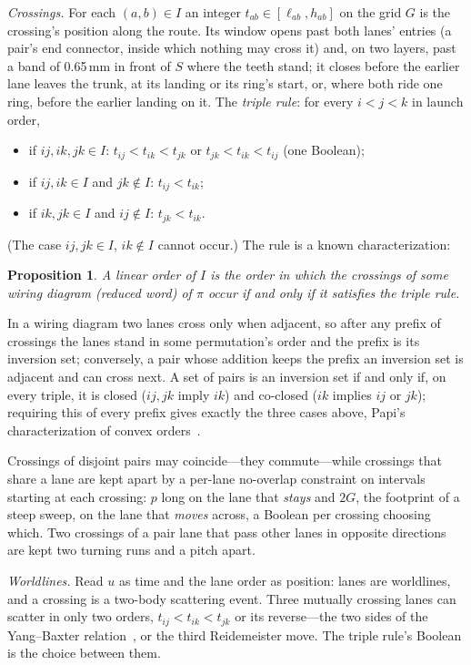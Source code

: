 \documentclass[journal]{IEEEtran}
\newtheorem{proposition}{Proposition}
\begin{document}
\emph{Crossings.} For each $(a,b)\in I$ an integer $t_{ab}\in[\ell_{ab},h_{ab}]$ on the grid $G$ is the crossing's position along the route. Its window opens past both lanes' entries (a pair's end connector, inside which nothing may cross it) and, on two layers, past a band of 0.65\,mm in front of $S$ where the teeth stand; it closes before the earlier lane leaves the trunk, at its landing or its ring's start, or, where both ride one ring, before the earlier landing on it. The \emph{triple rule}: for every $i<j<k$ in launch order,
\begin{itemize}
\item if $ij,ik,jk\in I$: $t_{ij}<t_{ik}<t_{jk}$ or $t_{jk}<t_{ik}<t_{ij}$ (one Boolean);
\item if $ij,ik\in I$ and $jk\notin I$: $t_{ij}<t_{ik}$;
\item if $ik,jk\in I$ and $ij\notin I$: $t_{jk}<t_{ik}$.
\end{itemize}
(The case $ij,jk\in I$, $ik\notin I$ cannot occur.) The rule is a known characterization:
\begin{proposition}
\label{prop:triple}
A linear order of $I$ is the order in which the crossings of some wiring diagram (reduced word) of $\pi$ occur if and only if it satisfies the triple rule.
\end{proposition}
\begin{IEEEproof}[Sketch]
In a wiring diagram two lanes cross only when adjacent, so after any prefix of crossings the lanes stand in some permutation's order and the prefix is its inversion set; conversely, a pair whose addition keeps the prefix an inversion set is adjacent and can cross next. A set of pairs is an inversion set if and only if, on every triple, it is closed ($ij,jk$ imply $ik$) and co-closed ($ik$ implies $ij$ or $jk$); requiring this of every prefix gives exactly the three cases above, Papi's characterization of convex orders~\cite{papi1994}.
\end{IEEEproof}
Crossings of disjoint pairs may coincide---they commute---while crossings that share a lane are kept apart by a per-lane no-overlap constraint on intervals starting at each crossing: $p$ long on the lane that \emph{stays} and $2G$, the footprint of a steep sweep, on the lane that \emph{moves} across, a Boolean per crossing choosing which. Two crossings of a pair lane that pass other lanes in opposite directions are kept two turning runs and a pitch apart.

\emph{Worldlines.} Read $u$ as time and the lane order as position: lanes are worldlines, and a crossing is a two-body scattering event. Three mutually crossing lanes can scatter in only two orders, $t_{ij}<t_{ik}<t_{jk}$ or its reverse---the two sides of the Yang--Baxter relation~\cite{baxter1972}, or the third Reidemeister move. The triple rule's Boolean is the choice between them.
\end{document}
